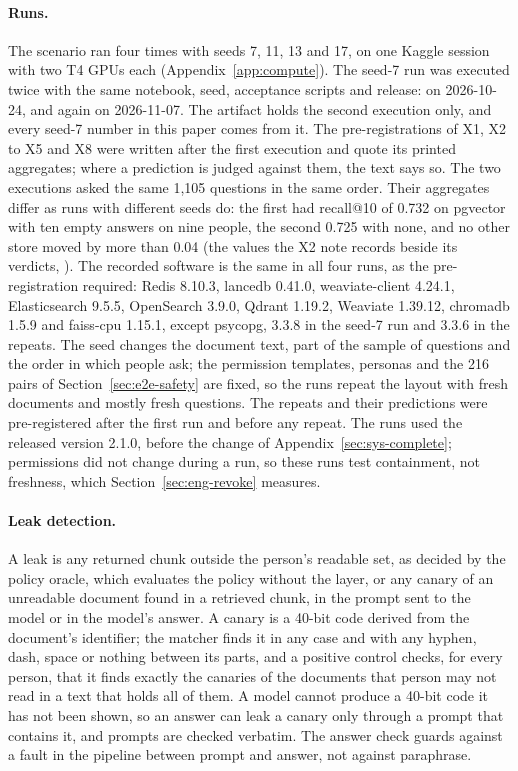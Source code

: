 \paragraph{Runs.}
The scenario ran four times with seeds 7, 11, 13 and 17, on one Kaggle session with two T4 GPUs each
(Appendix~\ref{app:compute}). The seed-7 run was executed twice with the same notebook, seed, acceptance scripts and
release: on 2026-10-24, and again on 2026-11-07. The artifact holds the second execution only, and every seed-7 number in this
paper comes from it. The pre-registrations of X1, X2 to X5 and X8 were written after the first execution and quote its printed
aggregates; where a prediction is judged against them, the text says so. The two executions asked the same 1,105 questions in
the same order. Their aggregates differ as runs with different seeds do: the first had recall@10 of 0.732 on pgvector with ten
empty answers on nine people, the second 0.725 with none, and no other store moved by more than 0.04 (the values the X2 note
records beside its verdicts, ). The recorded software is the same in all four runs, as the
pre-registration required: Redis 8.10.3, lancedb 0.41.0, weaviate-client 4.24.1, Elasticsearch 9.5.5, OpenSearch 3.9.0,
Qdrant 1.19.2, Weaviate 1.39.12, chromadb 1.5.9 and faiss-cpu 1.15.1, except psycopg, 3.3.8 in the seed-7 run and 3.3.6 in
the repeats.
The seed changes the document
text, part of the sample of questions and the order in which people ask; the permission templates,
personas and the 216 pairs of Section~\ref{sec:e2e-safety} are fixed, so the runs repeat the layout with fresh documents and mostly fresh questions. The repeats
and their predictions were pre-registered after the first run and before any repeat. The runs used
the released version 2.1.0, before the change of Appendix~\ref{sec:sys-complete}; permissions did not
change during a run, so these runs test containment, not freshness, which
Section~\ref{sec:eng-revoke} measures.

\paragraph{Leak detection.}
A leak is any returned chunk outside the person's readable set, as decided by the policy oracle,
which evaluates the policy without the layer, or any canary of an unreadable document found in a
retrieved chunk, in the prompt sent to the model or in the model's answer. A canary is a 40-bit code derived
from the document's identifier; the matcher finds it in any case and with any hyphen, dash, space or
nothing between its parts, and a positive control checks, for every person, that it finds exactly
the canaries of the documents that person may not read in a text that holds all of them. A model
cannot produce a 40-bit code it has not been shown, so an answer can leak a canary only through a
prompt that contains it, and prompts are checked verbatim. The answer check guards against a fault
in the pipeline between prompt and answer, not against paraphrase.

